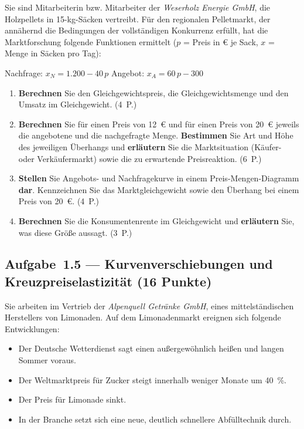 Sie sind Mitarbeiterin bzw. Mitarbeiter der \emph{Weserholz Energie GmbH}, die Holzpellets
in 15-kg-Säcken vertreibt. Für den regionalen Pelletmarkt, der annähernd die Bedingungen
der vollständigen Konkurrenz erfüllt, hat die Marktforschung folgende Funktionen ermittelt
($p$ = Preis in € je Sack, $x$ = Menge in Säcken pro Tag):

\begin{center}
Nachfrage: \quad $x_N = 1.200 - 40\,p$ \qquad\qquad Angebot: \quad $x_A = 60\,p - 300$
\end{center}

\begin{enumerate}[label=\alph*)]
  \item \textbf{Berechnen} Sie den Gleichgewichtspreis, die Gleichgewichtsmenge und den
    Umsatz im Gleichgewicht. \hfill (4~P.)
  \item \textbf{Berechnen} Sie für einen Preis von 12~€ und für einen Preis von 20~€
    jeweils die angebotene und die nachgefragte Menge. \textbf{Bestimmen} Sie Art und
    Höhe des jeweiligen Überhangs und \textbf{erläutern} Sie die Marktsituation
    (Käufer- oder Verkäufermarkt) sowie die zu erwartende Preisreaktion. \hfill (6~P.)
  \item \textbf{Stellen} Sie Angebots- und Nachfragekurve in einem Preis-Mengen-Diagramm
    \textbf{dar}. Kennzeichnen Sie das Marktgleichgewicht sowie den Überhang bei einem
    Preis von 20~€. \hfill (4~P.)
  \item \textbf{Berechnen} Sie die Konsumentenrente im Gleichgewicht und
    \textbf{erläutern} Sie, was diese Größe aussagt. \hfill (3~P.)
\end{enumerate}

\subsection*{Aufgabe~1.5 --- Kurvenverschiebungen und Kreuzpreiselastizität (16 Punkte)}

Sie arbeiten im Vertrieb der \emph{Alpenquell Getränke GmbH}, eines mittelständischen
Herstellers von Limonaden. Auf dem Limonadenmarkt ereignen sich folgende Entwicklungen:
\begin{itemize}
  \item[(1)] Der Deutsche Wetterdienst sagt einen außergewöhnlich heißen und langen Sommer
    voraus.
  \item[(2)] Der Weltmarktpreis für Zucker steigt innerhalb weniger Monate um 40~\%.
  \item[(3)] Der Preis für Limonade sinkt.
  \item[(4)] In der Branche setzt sich eine neue, deutlich schnellere Abfülltechnik durch.
\end{itemize}

